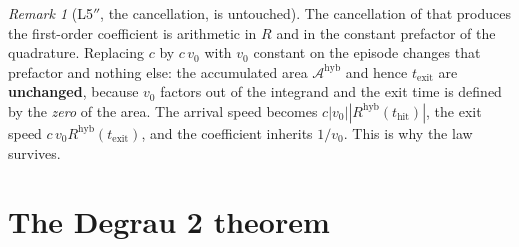 \documentclass[11pt]{article}
\theoremstyle{remark}
\newtheorem{remark}[theorem]{Remark}
\newcommand{\thit}{t_{\mathrm{hit}}}
\newcommand{\texit}{t_{\mathrm{exit}}}
\newcommand{\Ar}{\mathcal{A}}
\newcommand{\hyb}{\mathrm{hyb}}
\begin{document}
\begin{remark}[L5$''$, the cancellation, is untouched]\label{rem:L5}
The cancellation of \cite[L5$'$, Rem.~B.4]{paper} that produces the first-order
coefficient is arithmetic in $R$ and in the constant prefactor of the
quadrature. Replacing $c$ by $c\,v_0$ with $v_0$ constant on the episode changes
that prefactor and nothing else: the accumulated area $\Ar^{\hyb}$ and hence
$\texit$ are \textbf{unchanged}, because $v_0$ factors out of the integrand and
the exit time is defined by the \emph{zero} of the area. The arrival speed
becomes $c|v_0||R^{\hyb}(\thit)|$, the exit speed $c\,v_0R^{\hyb}(\texit)$, and
the coefficient inherits $1/v_0$. This is why the law survives.
\end{remark}

\section{The Degrau 2 theorem}\label{sec:thm}
\end{document}
